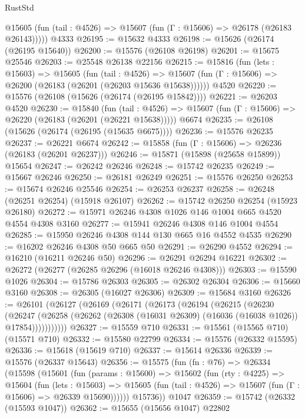 \begin{lexlean}{RustStd}
\begin{coremodule}
      @15605 (fun (tail : @4526) => @15607 (fun (Γ : @15606) => @26178 (@26183 @26143)))))
    @4333
@26195 := @15632 @4333
@26198 := @15626 (@26174 (@26195 @15640))
@26200 := @15576 (@26108 @26198)
@26201 := @15675 @25546
@26203 := @25548 @26138 @22156
@26215 := @15816
    (fun (lets : @15603) =>
    @15605
      (fun (tail : @4526) =>
      @15607 (fun (Γ : @15606) => @26200 (@26183 (@26201 (@26203 @15636 @15638))))))
    @4520
@26220 := @15576 (@26108 (@15626 (@26174 (@26195 @15842))))
@26221 := @26203 @4520
@26230 := @15840
    (fun (tail : @4526) => @15607 (fun (Γ : @15606) => @26220 (@26183 (@26201 (@26221 @15638)))))
    @6674
@26235 := @26108 (@15626 (@26174 (@26195 (@15635 @6675))))
@26236 := @15576 @26235
@26237 := @26221 @6674
@26242 := @15858 (fun (Γ : @15606) => @26236 (@26183 (@26201 @26237)))
@26246 := @15871 (@15898 (@25658 @15899)) @15654
@26247 := @26242 @26246
@26248 := @15742 @26235
@26249 := @15667 @26246
@26250 := @26181 @26249
@26251 := @15576 @26250
@26253 := @15674 @26246 @25546
@26254 := @26253 @26237
@26258 := @26248 (@26251 @26254) (@15918 @26107)
@26262 := @15742 @26250 @26254 (@15923 @26180)
@26272 := @15971 @26246 @4308 @1026 @146 @1004 @665 @4520 @4554 @4308 @3160
@26277 := @15941 @26246 @4308 @146 @1004 @4554
@26285 := @15950 @26246 @4308 @144 @130 @665 @16 @4552 @4535
@26290 := @16202 @26246 @4308 @50 @665 @50
@26291 := @26290 @4552
@26294 := @16210 (@16211 @26246 @50)
@26296 := @26291 @26294 @16221
@26302 := @26272 (@26277 (@26285 @26296 (@16018 @26246 @4308)))
@26303 := @15590 @1026
@26304 := @15786 @26303
@26305 := @26302 @26304
@26306 := @15660 @3160
@26308 := @26305 (@16027 @26306)
@26309 := @15684 @3160
@26326 := @26101
    (@26127
      (@26169
        (@26171
          (@26173
            (@26194
              (@26215
                (@26230
                  (@26247
                    (@26258
                      (@26262 (@26308 (@16031 @26309) (@16036 (@16038 @1026)) @17854)))))))))))
@26327 := @15559 @710
@26331 := @15561 (@15565 @710) (@15571 @710)
@26332 := @15580 @22799
@26334 := @15576 (@26332 @15595)
@26336 := @15618 (@15619 @710)
@26337 := @15614 @26336
@26339 := @15576 (@26337 @15643)
@26356 := @15575
    (fun (fn : @76) =>
    @26334
      (@15598
        (@15601
          (fun (params : @15600) =>
          @15602
            (fun (rty : @4225) =>
            @15604
              (fun (lets : @15603) =>
              @15605 (fun (tail : @4526) => @15607 (fun (Γ : @15606) => @26339 @15690))))))
        @15736))
    @1047
@26359 := @15742 (@26332 (@15593 @1047))
@26362 := @15655 (@15656 @1047) @22802

\end{coremodule}
\end{lexlean}
